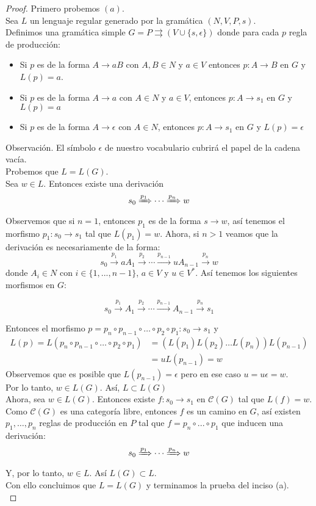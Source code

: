 \documentclass[../main.tex]{subfiles}
\begin{document}
 \begin{proof}
 	
 	
 	Primero probemos $(a)$.\\
 	Sea $L$ un lenguaje regular generado por la gramática $(N,V,P,s)$. \\
 	Definimos una gramática simple $G=P \rightrightarrows (V \cup \{ s, \epsilon \})$ donde para cada $p$ regla de producción:
 	\begin{itemize}
 		\item Si $p$ es de la forma $A \to aB$ con $A,B \in N$ y $a \in V$ entonces $p:A \to B$ en $G$ y $L(p)=a$.
 		\item Si $p$ es de la forma $A \to a$ con $A \in N$ y $a \in V$, entonces $p:A \to s_1$ en $G$ y $L(p)=a$
 		\item Si $p$ es de la forma $A \to \epsilon$ con $A \in N$, entonces $p:A \to s_1$ en $G$ y $L(p)=\epsilon$
 	\end{itemize}
    Observación. El símbolo $\epsilon$ de nuestro vocabulario cubrirá el papel de la cadena vacía. \\
 	
 	Probemos que $L=L(G)$.\\
 	Sea $w \in L$. 
 	Entonces existe una derivación
 	\[ s_0 \xRightarrow{p_1} \cdots \xRightarrow{p_n} w\]
 	Observemos que si $n=1$, entonces $p_1$ es de la forma $s \to w$, así tenemos el morfismo $p_1: s_0 \to s_1$ tal que $L(p_1)=w$.
 	Ahora, si $n>1$ veamos que la derivación es necesariamente de la forma: 
 	\[ s_0 \xrightarrow{p_1} aA_1 \xrightarrow{p_2} \cdots \xrightarrow{p_{n-1}} uA_{n-1} \xrightarrow{p_n} w\]
 	donde $A_i \in N$ con $i \in \{ 1, ..., n-1 \}$, $a\in V$ y $u \in V^*$. Así tenemos los siguientes morfismos en $G$: 
 	
 	\[ s_0 \xrightarrow{p_1} A_1 \xrightarrow{p_2} \cdots \xrightarrow{p_{n-1}} A_{n-1} \xrightarrow{p_n} s_1\]
 	
 	Entonces el morfismo $p =  p_n \circ p_{n-1} \circ \dots \circ p_2 \circ p_1: s_0 \to s_1$ y
 	\begin{align*}
	 	 L(p)=L(p_n \circ p_{n-1} \circ \dots \circ p_2 \circ p_1) &=(L(p_1) L(p_2) \dots L(p_n)) L(p_{n-1}) \\
	 	 &= u L(p_{n-1}) = w
 	\end{align*}
 	Observemos que es posible que $L(p_{n-1}) = \epsilon$ pero en ese caso $u = u \epsilon = w$. \\
 	Por lo tanto, $w \in L(G)$. Así, $L \subset L(G)$\\
 	Ahora, sea $w \in L(G)$. 
 	Entonces existe $f:s_0 \to s_1$ en $\mathcal{C}(G)$ tal que $L(f)=w$. Como $\mathcal{C}(G)$ es una categoría libre, entonces $f$ es un camino en $G$, así existen $p_1, \dots, p_n$ reglas de producción en $P$ tal que $f=p_n \circ ... \circ p_1$ que inducen una derivación: 
 	\[
 		s_0 \xRightarrow{p_1} \cdots \xRightarrow{p_n} w
 	\]
 	Y, por lo tanto, $w \in L$. Así $L(G) \subset L$. \\
 	Con ello concluimos que $L=L(G)$ y terminamos la prueba del inciso (a). \\
    

\end{proof}
\end{document}
